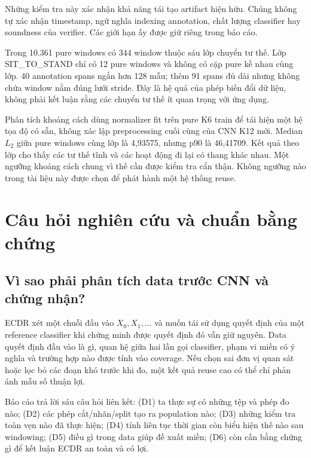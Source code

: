 \documentclass[11pt,a4paper]{article}
\theoremstyle{definition}
\begin{document}
Những kiểm tra này xác nhận khả năng tái tạo artifact hiện hữu. Chúng không
tự xác nhận timestamp, ngữ nghĩa indexing annotation, chất lượng classifier
hay soundness của verifier. Các giới hạn ấy được giữ riêng trong báo cáo.

Trong 10.361 pure windows có 344 window thuộc sáu lớp chuyển tư thế. Lớp
SIT\_TO\_STAND chỉ có 12 pure windows và không có cặp pure kề nhau cùng lớp.
40 annotation spans ngắn hơn 128 mẫu; thêm 91 spans đủ dài nhưng không chứa
window nằm đúng lưới stride. Đây là hệ quả của phép biến đổi dữ liệu, không
phải kết luận rằng các chuyển tư thế ít quan trọng với ứng dụng.

Phân tích khoảng cách dùng normalizer fit trên pure K6 train để tái hiện
một hệ tọa độ có sẵn, không xác lập preprocessing cuối cùng của CNN K12 mới.
Median $L_2$ giữa pure windows cùng lớp là 4,93575, nhưng p90 là 46,41709.
Kết quả theo lớp cho thấy các tư thế tĩnh và các hoạt động đi lại có thang
khác nhau. Một ngưỡng khoảng cách chung vì thế cần được kiểm tra cẩn thận.
Không ngưỡng nào trong tài liệu này được chọn để phát hành một hệ thống reuse.

\begingroup\small\setlength{\parskip}{0pt}\tableofcontents\endgroup
\clearpage

\section{Câu hỏi nghiên cứu và chuẩn bằng chứng}
\subsection{Vì sao phải phân tích data trước CNN và chứng nhận?}
ECDR xét một chuỗi đầu vào $X_0,X_1,\ldots$ và muốn tái sử dụng quyết định của
một reference classifier khi chứng minh được quyết định đó vẫn giữ nguyên.
Data quyết định đầu vào là gì, quan hệ giữa hai lần gọi classifier, phạm vi
miền có ý nghĩa và trường hợp nào được tính vào coverage. Nếu chọn sai đơn
vị quan sát hoặc lọc bỏ các đoạn khó trước khi đo, một kết quả reuse cao có
thể chỉ phản ánh mẫu số thuận lợi.

Báo cáo trả lời sáu câu hỏi liên kết: (D1) ta thực sự có những tệp và phép
đo nào; (D2) các phép cắt/nhãn/split tạo ra population nào; (D3) những kiểm
tra toàn vẹn nào đã thực hiện; (D4) tính liên tục thời gian còn biểu hiện
thế nào sau windowing; (D5) điều gì trong data giúp đề xuất miền; (D6) còn
cần bằng chứng gì để kết luận ECDR an toàn và có lợi.
\end{document}
